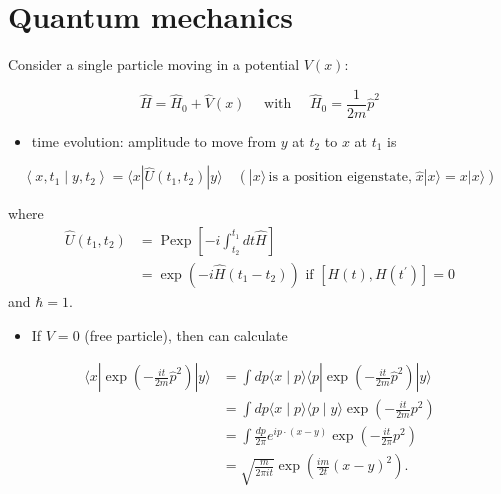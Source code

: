 \newpage


\section{Quantum mechanics}

Consider a single particle moving in a potential \(V(x)\):

\begin{equation}
\hat{H}=\hat{H}_{0}+\hat{V}(x) \quad \text { with } \quad \hat{H}_{0}=\frac{1}{2 m} \hat{p}^{2}
\end{equation}

\begin{itemize}
  \item time evolution: amplitude to move from \(y\) at \(t_{2}\) to \(x\) at \(t_{1}\) is
\end{itemize}

\begin{equation}
\left\langle x, t_{1} \mid y, t_{2}\right\rangle=\langle x| \hat{U}\left(t_{1}, t_{2}\right)|y\rangle \quad (|x\rangle \, \text{is a position eigenstate,}\; \hat{x}|x\rangle=x|x\rangle)
\end{equation}

where
\begin{equation}
\begin{aligned}
\hat{U}\left(t_{1}, t_{2}\right)&=\operatorname{Pexp}\left[-i \int_{t_{2}}^{t_{1}} d t \hat{H}\right]
\\
&= \operatorname { e x p } \left( - i \hat { H } ( t _ { 1 } - t _ { 2 } ) \right) \text { if } \left[H(t), H(t^\prime)\right]=0
\end{aligned}
\end{equation}
and \(\hbar=1\).


\begin{itemize}
  \item If \(V=0\) (free particle), then can calculate
\end{itemize}

\begin{equation}
\begin{aligned}
\langle x| \exp \left(-\frac{i t}{2 m} \hat{p}^{2}\right)|y\rangle & =\int d p\langle x \mid p\rangle\langle p| \exp \left(-\frac{i t}{2 m} \hat{p}^{2}\right)|y\rangle \\
& =\int d p\langle x \mid p\rangle\langle p \mid y\rangle \exp \left(-\frac{i t}{2 m} p^{2}\right) \\
& =\int \frac{d p}{2 \pi} e^{i p \cdot(x-y)} \exp \left(-\frac{i t}{2 \pi} p^{2}\right) \\
& =\sqrt{\frac{m}{2 \pi i t}} \exp \left(\frac{i m}{2 t}\left(x-y\right)^{2}\right).
\end{aligned}
\end{equation}

